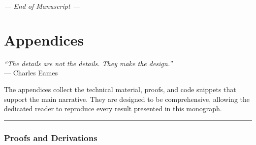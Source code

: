 \documentclass[11pt,letterpaper,oneside]{article}
\theoremstyle{plain}
\theoremstyle{definition}
\theoremstyle{remark}
\begin{document}
\bigskip
\begin{flushright}
\emph{— End of Manuscript —}
\end{flushright}


\appendix
\part*{Appendices}
\begin{center}
\emph{“The details are not the details. They make the design.”}\\
— Charles Eames
\end{center}
\bigskip

The appendices collect the technical material, proofs, and code snippets that support the main narrative. They are designed to be comprehensive, allowing the dedicated reader to reproduce every result presented in this monograph.

\bigskip
\hrule
\bigskip

\newpage

\section{Proofs and Derivations}
\label{app:proofs}
\end{document}
